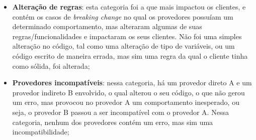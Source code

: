 \begin{itemize}
    \item \textbf{Alteração de regras}: esta categoria foi a que mais impactou os clientes, e contém os casos de \textit{breaking change} no qual os provedores possuíam um determinado comportamento, mas alteraram algumas de suas regras/funcionalidades e impactaram os seus clientes. Não foi uma simples alteração no código, tal como uma alteração de tipo de variáveis, ou um código escrito de maneira errada, mas sim uma regra da qual o cliente tinha como sólida, foi alterada; %



    \item \textbf{Provedores incompatíveis}: nessa categoria, há um provedor direto A e um provedor indireto B envolvido, o qual alterou o seu código, o que não gerou um erro, mas provocou no provedor A um comportamento inesperado, ou seja, o provedor B passou a ser incompatível com o provedor A. Nessa categoria, nenhum dos provedores contém um erro, mas sim uma incompatibilidade; %



\end{itemize}

